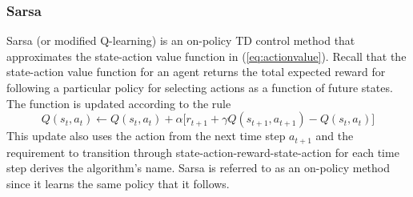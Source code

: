 \subsubsection{Sarsa}
\label{sec:sarsa}
Sarsa (or modified Q-learning) is an on-policy TD control method that
approximates the state-action value function in (\ref{eq:actionvalue}).
Recall that the state-action value function for an agent returns the total
expected reward for following a particular policy for selecting actions as a
function of future states.  The function is updated according to the rule
\begin{equation}
\label{eq:sarsa}
Q(s_t,a_t) \leftarrow Q(s_t,a_t) + \alpha \bigl[r_{t+1} + \gamma
Q(s_{t+1},a_{t+1}) - Q(s_t,a_t)\bigr]
\end{equation}
This update also uses the action from the next time step $a_{t+1}$ and the
requirement to transition through state-action-reward-state-action for each
time step derives the algorithm's name.  Sarsa is referred to as an on-policy
method since it learns the same policy that it follows.

